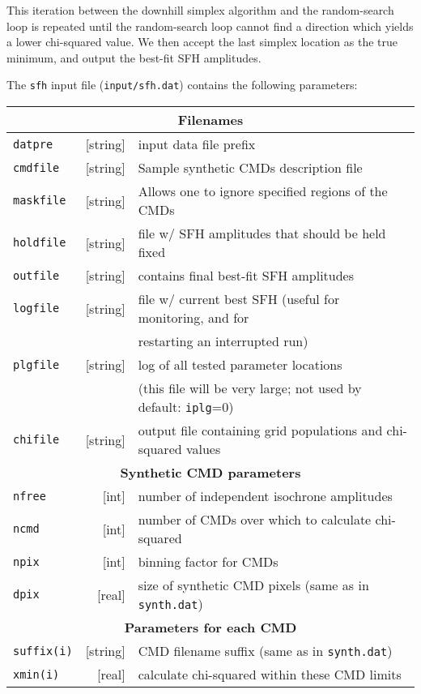 \documentclass[12pt]{book}
\def\ttg{\tt\color{DarkGreen}}
\def\tto{\tt\color{myOrange}}
\begin{document}
This iteration between the downhill simplex algorithm and the 
random-search loop is repeated until the random-search loop cannot 
find a direction which yields a lower chi-squared value.
We then accept the last simplex location as the true minimum, and 
output the best-fit SFH amplitudes.

\bigskip
\noindent The {\ttg sfh} input file ({\ttg input/sfh.dat}) contains 
the following parameters:

\medskip
\noindent
{\scriptsize
\begin{tabular}{|lr|l|} 
\hline
\multicolumn{3}{|c|}{\bf Filenames} \\ 
\hline
{\tto datpre}   &[string]& input data file prefix\\ 
{\tto cmdfile}  &[string]& Sample synthetic CMDs description file\\
{\tto maskfile} &[string]& Allows one to ignore specified regions of the CMDs\\
{\tto holdfile} &[string]& file w/ SFH amplitudes that should be held fixed\\
{\tto outfile}  &[string]& contains final best-fit SFH amplitudes\\
{\tto logfile}  &[string]& file w/ current best SFH (useful for monitoring, and for\\
                && restarting an interrupted run)\\
{\tto plgfile}  &[string]& log of all tested parameter locations \\
                && (this file will be very large; not used by default: {\tto iplg}=0)\\
{\tto chifile}  &[string]& output file containing grid populations and chi-squared values\\
\hline
\multicolumn{3}{|c|}{\bf Synthetic CMD parameters} \\ 
\hline
{\tto nfree}  & [int]& number of independent isochrone amplitudes\\
{\tto ncmd}   & [int]& number of CMDs over which to calculate chi-squared\\
{\tto npix}   & [int]& binning factor for CMDs\\
{\tto dpix}   &[real]& size of synthetic CMD pixels (same as in {\ttg synth.dat})\\
\hline
\multicolumn{3}{|c|}{\bf Parameters for each CMD} \\ 
\hline
{\tto suffix(i)} &[string]& CMD filename suffix (same as in {\ttg synth.dat})\\
{\tto   xmin(i)} & [real] & calculate chi-squared within these CMD limits\\

\end{tabular}}
\end{document}
